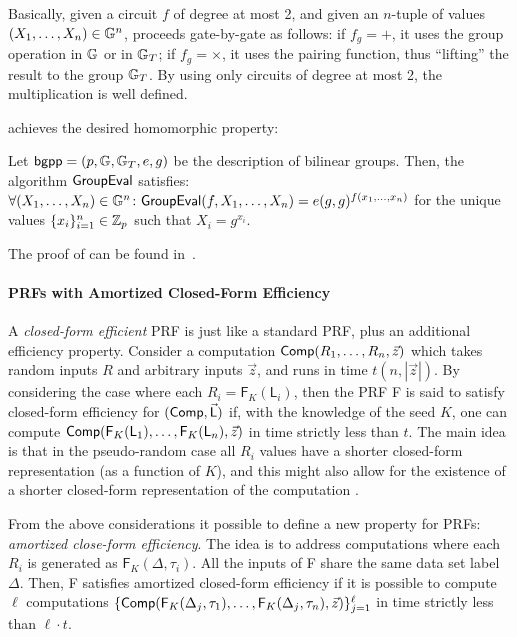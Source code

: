 Basically, given a circuit $f$ of degree at most 2, and given an $n$-tuple of
values $(X_1, \dotsc, X_n) \in \mathbb{G}^n$, \GroupEval proceeds gate-by-gate as
follows: if $f_g = +$, it uses the group operation in $\mathbb{G}$ or in $\mathbb{G}_T$; if
$f_g = \times$, it uses the pairing function, thus ``lifting'' the result to
the group $\mathbb{G}_T$. By using only circuits of degree at most 2, the
multiplication is well defined.

\GroupEval achieves the desired homomorphic property:
\begin{theorem}\label{theo:group-eval-homo-prop}
  Let $\bgpp = (p, \bbG, \bbG_T, e, g)$ be the description of bilinear groups.
  Then, the algorithm $\GroupEval$ satisfies: $\forall(X_1, \dotsc, X_n) \in
  \bbG^n \colon \GroupEval(f, X_1, \dotsc, X_n) = e(g,g)^{f(x_1, \dotsc, x_n)}$
  for the unique values $\{x_i\}^n_{i=1} \in \mathbb{Z}_p$ such that $X_i = g^{x_i}$.
\end{theorem}
The proof of  can be found
in~\cite{backes:fiore:reischuk:2013}.

\paragraph*{PRFs with Amortized Closed-Form Efficiency}
A \emph{closed-form efficient} PRF is just like a standard PRF, plus an
additional efficiency property. Consider a computation $\Comp(R_1, \dotsc, R_n,
\vec{z})$ which takes random inputs $R$ and arbitrary inputs $\vec{z}$, and
runs in time $t(n, |\vec{z}|)$. By considering the case where each $R_i
= \mathsf{F}_K(\mathsf{L}_i)$, then the PRF \textsf{F} is said to satisfy
closed-form efficiency for $(\Comp, \vec{\mathsf{L}})$ if, with the knowledge
of the seed $K$, one can compute $\Comp(\mathsf{F}_K(\mathsf{L}_1), \dotsc,
\mathsf{F}_K(\mathsf{L}_n), \vec{z})$ in time strictly less than $t$. The main
idea is that in the pseudo-random case all $R_i$ values have a shorter
closed-form representation (as a function of $K$), and this might also allow
for the existence of a shorter closed-form representation of the computation
\Comp.

From the above considerations it possible to define a new property for PRFs:
\emph{amortized close-form efficiency}. The idea is to address computations
where each $R_i$ is generated as $\mathsf{F}_K(\Delta, \tau_i)$. All the inputs
of \textsf{F} share the same data set label $\Delta$. Then, \textsf{F}
satisfies amortized closed-form efficiency if it is possible to compute $\ell$
computations $\{\Comp(\mathsf{F}_K(\Delta_j, \tau_1), \dotsc,
\mathsf{F}_K(\Delta_j, \tau_n), \vec{z})\}^\ell_{j = 1}$ in time strictly less
than $\ell \cdot t$.

